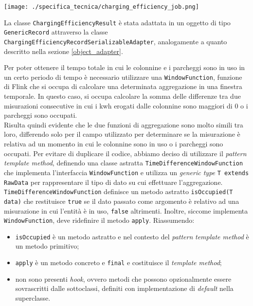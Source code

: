 \begin{center}
	\texttt{[image: ./specifica\_tecnica/charging\_efficiency\_job.png]}
\end{center}

La classe \texttt{ChargingEfficiencyResult} è stata adattata in un oggetto di tipo \texttt{GenericRecord} attraverso la classe \texttt{ChargingEfficiencyRecordSerializableAdapter},
analogamente a quanto descritto nella sezione \ref{object_adapter}.

Per poter ottenere il tempo totale in cui le colonnine e i parcheggi sono in uso in un certo periodo di tempo è necessario utilizzare una \texttt{WindowFunction},
funzione di Flink che si occupa di calcolare una determinata aggregazione in una finestra temporale. In questo caso, si occupa calcolare la somma delle differenze
tra due misurazioni consecutive in cui i kwh erogati dalle colonnine sono maggiori di 0 o i parcheggi sono occupati.\\
Risulta quindi evidente che le due funzioni di aggregazione sono molto simili tra loro, differendo solo per il campo utilizzato per determinare se la misurazione
è relativa ad un momento in cui le colonnine sono in uso o i parcheggi sono occupati. Per evitare di duplicare il codice, abbiamo deciso di utilizzare il \textit{pattern}
\textit{template method}, definendo una classe astratta \texttt{TimeDifferenceWindowFunction} che implementa l'interfaccia \texttt{WindowFunction}
e utilizza un \textit{generic type} \texttt{T extends RawData} per rappresentare il tipo di dato su cui effettuare l'aggregazione.
\texttt{TimeDifferenceWindowFunction} definisce un metodo astratto \texttt{isOccupied(T data)} che restituisce \texttt{true} se il dato passato come argomento è relativo ad una misurazione in cui
l'entità è in uso, \texttt{false} altrimenti. Inoltre, siccome implementa \texttt{WindowFunction}, deve ridefinire il metodo \texttt{apply}.
Riassumendo:
\begin{itemize}
	\item \texttt{isOccupied} è un metodo astratto e nel contesto del \textit{pattern} \textit{template method} è un metodo primitivo;
	\item \texttt{apply} è un metodo concreto e \texttt{final} e costituisce il \textit{template method};
	\item non sono presenti \textit{hook}, ovvero metodi che possono opzionalmente essere sovrascritti dalle sottoclassi, definiti con implementazione di \textit{default} nella superclasse.
\end{itemize}

